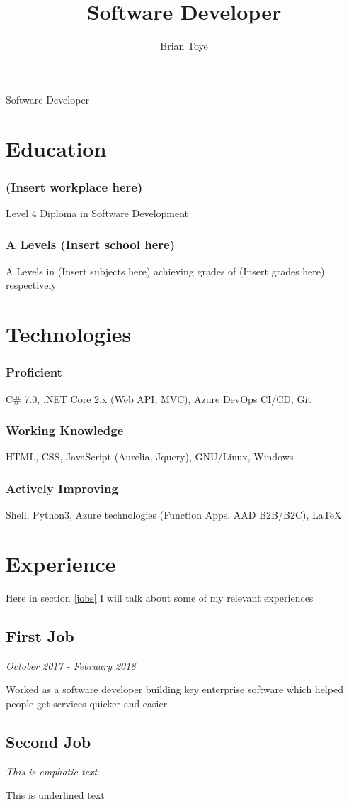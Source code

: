 \documentclass{article}
\author{Brian Toye}
\title{Software Developer}
\renewcommand{\maketitle}{
\begin{center}
{\huge\bfseries
\theauthor}

\vspace{.25em}

Software Developer
\end{center}
}
\begin{document}
\maketitle

\section{Education}

\subsubsection{(Insert workplace here)}
Level 4 Diploma in Software Development

\subsubsection{A Levels (Insert school here)}
A Levels in (Insert subjects here) achieving grades of (Insert grades here) respectively

\section{Technologies}

\subsubsection{Proficient}
C\# 7.0, .NET Core 2.x (Web API, MVC), Azure DevOps CI/CD, Git

\subsubsection{Working Knowledge}
HTML, CSS, JavaScript (Aurelia, Jquery), GNU/Linux, Windows

\subsubsection{Actively Improving}
Shell, Python3, Azure technologies (Function Apps, AAD B2B/B2C), {\LaTeX}

\section{Experience\label{jobs}}

Here in section \ref{jobs} I will talk about some of my relevant experiences

\subsection{First Job}

\textit {October 2017 - February 2018}

Worked as a software developer building key enterprise software which helped people get services quicker and easier

\subsection{Second Job}

\emph{This is emphatic text}

\underline{This is underlined text}
\end{document}
